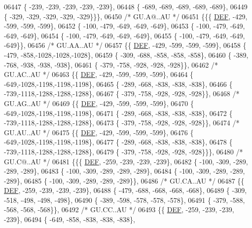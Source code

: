 \begin{DoxyCode}
06447 \{ -239, -239, -239, -239, -239\},
06448 \{ -689, -689, -689, -689, -689\},
06449 \{ -329, -329, -329, -329, -329\}\}\},
06450 \textcolor{comment}{/* GU.A@..AU */}
06451 \{\{\{  \mbox{\hyperlink{1_88_84__epars_8h_a397419fc12b37ed479c8abb9d444d843}{DEF}}, -429, -599, -599, -599\},
06452 \{ -100, -479, -649, -649, -649\},
06453 \{ -100, -479, -649, -649, -649\},
06454 \{ -100, -479, -649, -649, -649\},
06455 \{ -100, -479, -649, -649, -649\}\},
06456 \textcolor{comment}{/* GU.AA..AU */}
06457 \{\{  \mbox{\hyperlink{1_88_84__epars_8h_a397419fc12b37ed479c8abb9d444d843}{DEF}}, -429, -599, -599, -599\},
06458 \{ -479, -858,-1028,-1028,-1028\},
06459 \{ -309, -688, -858, -858, -858\},
06460 \{ -389, -768, -938, -938, -938\},
06461 \{ -379, -758, -928, -928, -928\}\},
06462 \textcolor{comment}{/* GU.AC..AU */}
06463 \{\{  \mbox{\hyperlink{1_88_84__epars_8h_a397419fc12b37ed479c8abb9d444d843}{DEF}}, -429, -599, -599, -599\},
06464 \{ -649,-1028,-1198,-1198,-1198\},
06465 \{ -289, -668, -838, -838, -838\},
06466 \{ -739,-1118,-1288,-1288,-1288\},
06467 \{ -379, -758, -928, -928, -928\}\},
06468 \textcolor{comment}{/* GU.AG..AU */}
06469 \{\{  \mbox{\hyperlink{1_88_84__epars_8h_a397419fc12b37ed479c8abb9d444d843}{DEF}}, -429, -599, -599, -599\},
06470 \{ -649,-1028,-1198,-1198,-1198\},
06471 \{ -289, -668, -838, -838, -838\},
06472 \{ -739,-1118,-1288,-1288,-1288\},
06473 \{ -379, -758, -928, -928, -928\}\},
06474 \textcolor{comment}{/* GU.AU..AU */}
06475 \{\{  \mbox{\hyperlink{1_88_84__epars_8h_a397419fc12b37ed479c8abb9d444d843}{DEF}}, -429, -599, -599, -599\},
06476 \{ -649,-1028,-1198,-1198,-1198\},
06477 \{ -289, -668, -838, -838, -838\},
06478 \{ -739,-1118,-1288,-1288,-1288\},
06479 \{ -379, -758, -928, -928, -928\}\}\},
06480 \textcolor{comment}{/* GU.C@..AU */}
06481 \{\{\{  \mbox{\hyperlink{1_88_84__epars_8h_a397419fc12b37ed479c8abb9d444d843}{DEF}}, -259, -239, -239, -239\},
06482 \{ -100, -309, -289, -289, -289\},
06483 \{ -100, -309, -289, -289, -289\},
06484 \{ -100, -309, -289, -289, -289\},
06485 \{ -100, -309, -289, -289, -289\}\},
06486 \textcolor{comment}{/* GU.CA..AU */}
06487 \{\{  \mbox{\hyperlink{1_88_84__epars_8h_a397419fc12b37ed479c8abb9d444d843}{DEF}}, -259, -239, -239, -239\},
06488 \{ -479, -688, -668, -668, -668\},
06489 \{ -309, -518, -498, -498, -498\},
06490 \{ -389, -598, -578, -578, -578\},
06491 \{ -379, -588, -568, -568, -568\}\},
06492 \textcolor{comment}{/* GU.CC..AU */}
06493 \{\{  \mbox{\hyperlink{1_88_84__epars_8h_a397419fc12b37ed479c8abb9d444d843}{DEF}}, -259, -239, -239, -239\},
06494 \{ -649, -858, -838, -838, -838\},

\end{DoxyCode}
